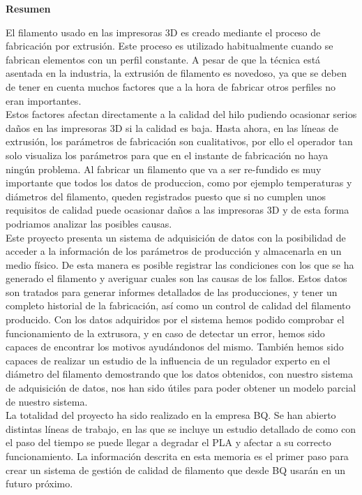 
\thispagestyle{empty}
\begin{center}
    \Large
    \vspace{0.9cm}
    \textbf{Resumen}
\end{center}

El filamento usado en las impresoras 3D es creado mediante el proceso de fabricación por extrusión. Este proceso es utilizado habitualmente cuando se fabrican elementos con un perfil constante. A pesar de que la técnica está asentada en la industria, la extrusión de filamento es novedoso, ya que se deben de tener en cuenta muchos factores que a la hora de fabricar otros perfiles no eran importantes.\\

Estos factores afectan directamente a la calidad del hilo pudiendo ocasionar serios daños en las impresoras 3D si la calidad es baja. Hasta ahora, en las líneas de extrusión, los parámetros de fabricación son cualitativos, por ello el operador tan solo visualiza los parámetros para que en el instante de fabricación no haya ningún problema. Al fabricar un filamento que va a ser re-fundido es muy importante que todos los datos de produccion, como por ejemplo temperaturas y diámetros del filamento, queden registrados puesto que si no cumplen unos requisitos de calidad puede ocasionar daños a las impresoras 3D y de esta forma podriamos analizar las posibles causas.\\

Este proyecto presenta un sistema de adquisición de datos con la posibilidad de acceder a la información de los parámetros de producción y almacenarla en un medio físico. De esta manera es posible registrar las condiciones con los que se ha generado el filamento y averiguar cuales son las causas de los fallos. Estos datos son tratados para generar informes detallados de las producciones, y tener un completo historial de la fabricación, así como un control de calidad del filamento producido. Con los datos adquiridos por el sistema hemos podido comprobar el funcionamiento de la extrusora, y en caso de detectar un error, hemos sido capaces de encontrar los motivos ayudándonos del mismo. También hemos sido capaces de realizar un estudio de la influencia de un regulador experto en el diámetro del filamento demostrando que los datos obtenidos, con nuestro sistema de adquisición de datos, nos han sido útiles para poder obtener un modelo parcial de nuestro sistema.\\

La totalidad del proyecto ha sido realizado en la empresa BQ. Se han abierto distintas líneas de trabajo, en las que se incluye un estudio detallado de como con el paso del tiempo se puede llegar a degradar el PLA y afectar a su correcto funcionamiento. La información descrita en esta memoria es el primer paso para crear un sistema de gestión de calidad de filamento que desde BQ usarán en un futuro próximo. \\

